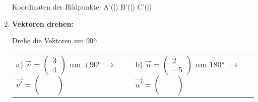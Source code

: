 \begin{enumerate}[label=\arabic*.,resume]
    Koordinaten der Bildpunkte:
    A'(\underline{\hspace{1cm}}|\underline{\hspace{1cm}}) \hspace{1cm}
    B'(\underline{\hspace{1cm}}|\underline{\hspace{1cm}}) \hspace{1cm}  
    C'(\underline{\hspace{1cm}}|\underline{\hspace{1cm}})

    \vspace{1cm}

    \item \textbf{Vektoren drehen:}

    Drehe die Vektoren um 90°:

    \begin{tabular}{ll}
        a) $\vec{v} = \begin{pmatrix} 3 \\ 4 \end{pmatrix}$ um +90° $\rightarrow$ $\vec{v'} = \begin{pmatrix} \phantom{-3} \\ \phantom{-3} \end{pmatrix}$ & 
        b) $\vec{u} = \begin{pmatrix} 2 \\ -5 \end{pmatrix}$ um 180° $\rightarrow$ $\vec{u'} = \begin{pmatrix} \phantom{-3} \\ \phantom{-3} \end{pmatrix}$
    \end{tabular}

\end{enumerate}